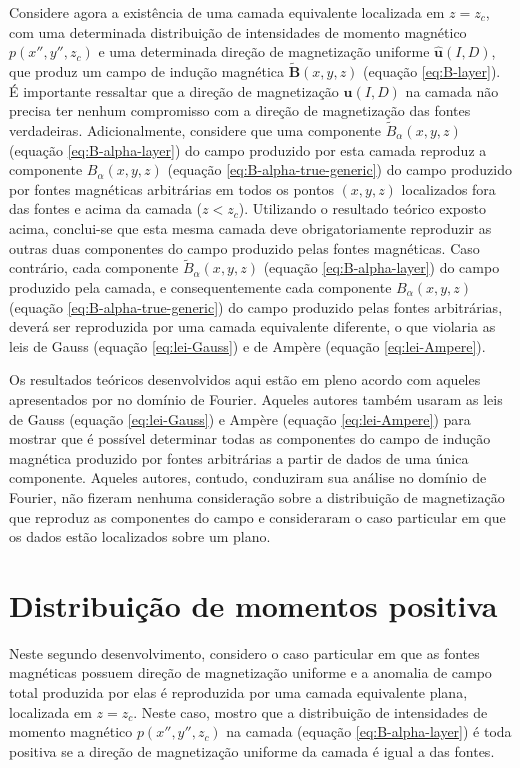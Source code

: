 Considere agora a existência de uma camada equivalente localizada em $z = z_{c}$, com uma determinada 
distribuição de intensidades de momento magnético $p(x'', y'', z_{c})$ e uma determinada 
direção de magnetização uniforme $\hat{\mathbf{u}}(I, D)$, que produz um campo de indução 
magnética $\tilde{\mathbf{B}}(x, y, z)$ (equação \ref{eq:B-layer}). 
É importante ressaltar que a direção de magnetização $\hat{\mathbf{u}}(I, D)$ na camada não 
precisa ter nenhum compromisso com a direção de magnetização das fontes verdadeiras.
Adicionalmente, considere que uma componente $\tilde{B}_{\alpha}(x, y, z)$ (equação \ref{eq:B-alpha-layer}) 
do campo produzido por esta camada reproduz a componente $B_{\alpha}(x, y, z)$ (equação \ref{eq:B-alpha-true-generic}) 
do campo produzido por fontes magnéticas arbitrárias em todos os pontos $(x, y, z)$ localizados fora das fontes e acima 
da camada ($z < z_{c}$). Utilizando o resultado teórico exposto acima, conclui-se que 
esta mesma camada deve obrigatoriamente reproduzir as outras duas componentes do campo produzido 
pelas fontes magnéticas. Caso contrário, cada componente $\tilde{B}_{\alpha}(x, y, z)$ 
(equação \ref{eq:B-alpha-layer}) do campo produzido pela camada, e consequentemente cada componente 
$B_{\alpha}(x, y, z)$ (equação \ref{eq:B-alpha-true-generic}) do campo produzido pelas fontes arbitrárias, 
deverá ser reproduzida por uma camada equivalente diferente, o que violaria as leis de 
Gauss (equação \ref{eq:lei-Gauss}) e de Ampère (equação \ref{eq:lei-Ampere}).

Os resultados teóricos desenvolvidos aqui estão em pleno acordo com aqueles apresentados por 
\citet{lima_weiss_2009} no domínio de Fourier. Aqueles autores também usaram as leis de Gauss 
(equação \ref{eq:lei-Gauss}) e Ampère (equação \ref{eq:lei-Ampere}) para mostrar que é possível 
determinar todas as componentes do campo de 
indução magnética produzido por fontes arbitrárias a partir de dados de uma única componente. 
Aqueles autores, contudo, conduziram sua análise no domínio de Fourier, não fizeram nenhuma consideração 
sobre a distribuição de magnetização que reproduz as componentes do campo e consideraram o caso 
particular em que os dados estão localizados sobre um plano.


\section{Distribuição de momentos positiva}
\label{sec:distribuicao-positiva}

Neste segundo desenvolvimento, considero o caso particular em que as fontes magnéticas possuem direção de magnetização uniforme e a anomalia de campo total produzida por elas é reproduzida por uma camada equivalente plana, localizada em $z = z_{c}$. 
Neste caso, mostro que a distribuição de intensidades de momento magnético 
$p(x'', y'', z_{c})$ na camada (equação \ref{eq:B-alpha-layer}) é toda positiva 
se a direção de magnetização uniforme da camada é igual a das fontes.

